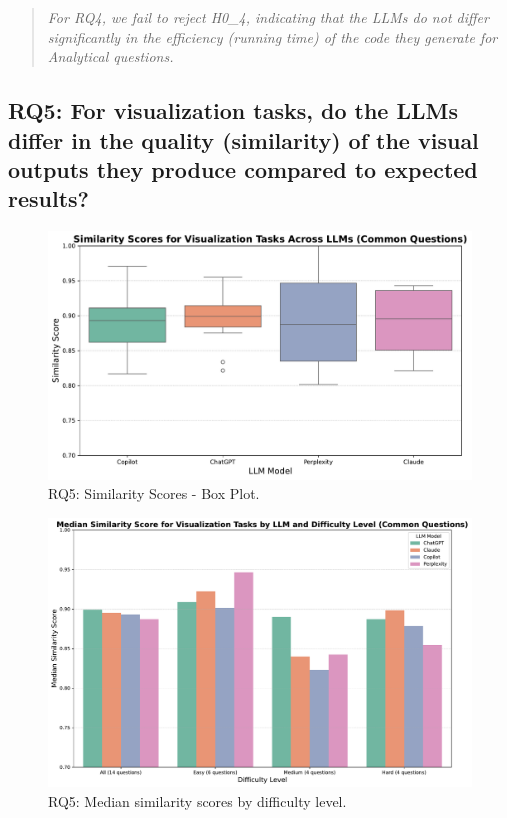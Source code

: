 \documentclass[conference]{IEEEtran}
\begin{document}
\begin{quote}
\textit{For RQ4, we fail to reject H0\_4, indicating that the LLMs do not differ significantly in the efficiency (running time) of the code they generate for Analytical questions.}
\end{quote}


\subsection{RQ5: For visualization tasks, do the LLMs differ in the quality (similarity) of the visual outputs they produce compared to expected results?}


\begin{figure}[!ht]
    \centering
    \includegraphics[width=1.0\linewidth]{figures/results/RQ5.pdf}
    \caption{RQ5: Similarity Scores - Box Plot.}
    \label{fig:rq5}
\end{figure}

\begin{figure}[!ht]
    \centering
    \includegraphics[width=1.0\linewidth]{figures/results/RQ5-2.pdf}
    \caption{RQ5: Median similarity scores by difficulty level.}
    \label{fig:rq5-2}
\end{figure}
\end{document}
